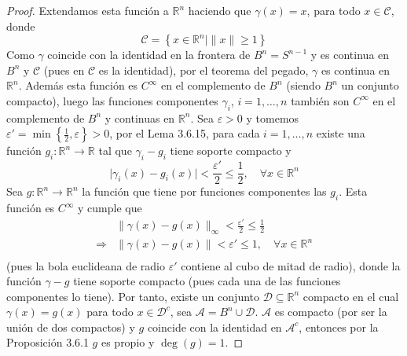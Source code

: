 \documentclass[12pt]{report}
\theoremstyle{largebreak}
\newcommand\abs[1]{\ensuremath{\lvert#1\rvert}}
\newcommand\cf[3]{\ensuremath{#1:#2\rightarrow#3}}
\begin{document}
\begin{proof}
    Extendamos esta función a $\mathbb{R}^n$ haciendo que $\gamma(x)=x$, para todo $x\in\mathcal{C}$, donde
    \begin{equation*}
        \mathcal{C}=\left\{x\in\mathbb{R}^n|\|x\|\geq1\right\}
    \end{equation*}
    Como $\gamma$ coincide con la identidad en la frontera de $B^n=S^{n-1}$ y es continua en $B^n$ y $\mathcal{C}$ (pues en $\mathcal{C}$ es la identidad), por el teorema del pegado, $\gamma$ es continua en $\mathbb{R}^n$. Además esta función es $C^\infty$ en el complemento de $B^n$ (siendo $B^n$ un conjunto compacto), luego las funciones componentes $\gamma_i$, $i=1,\dots,n$ también son $C^\infty$ en el complemento de $B^n$ y continuas en $\mathbb{R}^n$.
    Sea $\varepsilon>0$ y tomemos $\varepsilon'=\min\left\{\frac{1}{2},\varepsilon\right\}>0$, por el Lema 3.6.15, para cada $i=1,\dots,n$ existe una función $\cf{g_i}{\mathbb{R}^n}{\mathbb{R}}$ tal que $\gamma_i-g_i$ tiene soporte compacto y
    \begin{equation*}
        \abs{\gamma_i(x)-g_i(x)}<\frac{\varepsilon'}{2}\leq\frac{1}{2},\quad\forall x\in\mathbb{R}^n
    \end{equation*}
    Sea $\cf{g}{\mathbb{R}^n}{\mathbb{R}^n}$ la función que tiene por funciones componentes las $g_i$. Esta función es $C^\infty$ y cumple que
    \begin{equation*}
        \begin{split}
            &\|\gamma(x)-g(x)\|_{\infty}< \frac{\varepsilon'}{2}\leq\frac{1}{2}\\
            \Rightarrow &\|\gamma(x)-g(x)\|< \varepsilon'\leq1,\quad\forall x\in\mathbb{R}^n\\
        \end{split}
    \end{equation*}
    (pues la bola euclideana de radio $\varepsilon'$ contiene al cubo de mitad de radio), donde la función $\gamma-g$ tiene soporte compacto (pues cada una de las funciones componentes lo tiene). Por tanto, existe un conjunto $\mathcal{D}\subseteq\mathbb{R}^n$ compacto en el cual $\gamma(x)=g(x)$ para todo $x\in\mathcal{D}^c$, sea $\mathcal{A}=B^n\cup\mathcal{D}$. $\mathcal{A}$ es compacto (por ser la unión de dos compactos) y $g$ coincide con la identidad en $\mathcal{A}^c$, entonces por la Proposición 3.6.1 $g$ es propio y $\deg(g)=1$.
    

\end{proof}
\end{document}
